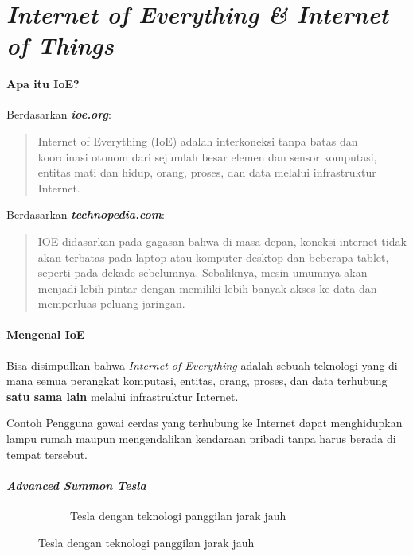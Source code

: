 \section{\textit{Internet of Everything \& Internet of Things}}
\begin{frame}{\insertsectionhead}
  \framesubtitle{Apa itu IoE?}
  \justifying
  Berdasarkan \textbf{\textit{ioe.org}}:
  \vfill
  \begin{quote}
  	Internet of Everything (IoE) adalah interkoneksi tanpa batas dan koordinasi otonom dari sejumlah besar elemen dan sensor komputasi, entitas mati dan hidup, orang, proses, dan data melalui infrastruktur Internet.
  \end{quote}
	\vfill
   Berdasarkan \textbf{\textit{technopedia.com}}:
	\vfill	
  \begin{quote}
  	IOE didasarkan pada gagasan bahwa di masa depan, koneksi internet tidak akan terbatas pada laptop atau komputer desktop dan beberapa tablet, seperti pada dekade sebelumnya. Sebaliknya, mesin umumnya akan menjadi lebih pintar dengan memiliki lebih banyak akses ke data dan memperluas peluang jaringan.
  \end{quote}
\end{frame}

\begin{frame}{\insertsectionhead}
	\framesubtitle{Mengenal IoE}
	\justifying
	Bisa disimpulkan bahwa \textit{Internet of Everything} adalah sebuah teknologi yang di mana semua perangkat komputasi, entitas, orang, proses, dan data terhubung \textbf{satu sama lain} melalui infrastruktur Internet.
	\vfill
	\begin{block}{Contoh}
		Pengguna gawai cerdas yang terhubung ke Internet dapat menghidupkan lampu rumah maupun mengendalikan kendaraan pribadi tanpa harus berada di tempat tersebut.
	\end{block}
\end{frame}

\begin{frame}{\insertsectionhead}
	\framesubtitle{\textit{Advanced Summon Tesla}}
	\justifying
	\begin{figure}[ht!]
			\begin{subfigure}[b]{0.7\textwidth}
					\caption*{Tesla dengan teknologi panggilan jarak jauh}
				\end{subfigure}
		\end{figure}
\end{frame}

